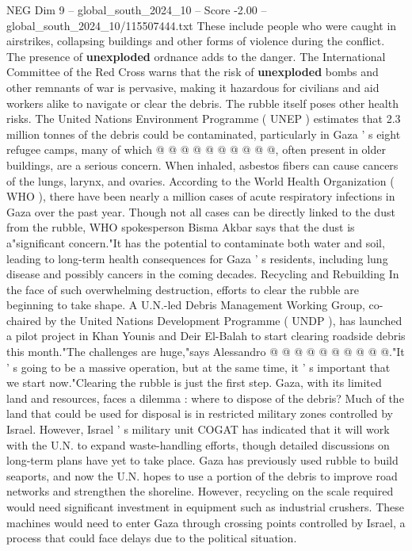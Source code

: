 \begin{textsample}{NEG Dim 9 – global\_south\_2024\_10 – Score -2.00 – global\_south\_2024\_10/115507444.txt}
These include people who were caught in airstrikes, collapsing buildings and other forms of violence during the conflict.
The presence of \textbf{unexploded} ordnance adds to the danger.
The International Committee of the Red Cross warns that the risk of \textbf{unexploded} bombs and other remnants of war is pervasive, making it hazardous for civilians and aid workers alike to navigate or clear the debris.
The rubble itself poses other health risks.
The United Nations Environment Programme ( UNEP ) estimates that 2.3 million tonnes of the debris could be contaminated, particularly in Gaza ' s eight refugee camps, many of which @ @ @ @ @ @ @ @ @ @, often present in older buildings, are a serious concern.
When inhaled, asbestos fibers can cause cancers of the lungs, larynx, and ovaries.
According to the World Health Organization ( WHO ), there have been nearly a million cases of acute respiratory infections in Gaza over the past year.
Though not all cases can be directly linked to the dust from the rubble, WHO spokesperson Bisma Akbar says that the dust is a"significant concern."It has the potential to contaminate both water and soil, leading to long-term health consequences for Gaza ' s residents, including lung disease and possibly cancers in the coming decades.
Recycling and Rebuilding In the face of such overwhelming destruction, efforts to clear the rubble are beginning to take shape.
A U.N.-led Debris Management Working Group, co-chaired by the United Nations Development Programme ( UNDP ), has launched a pilot project in Khan Younis and Deir El-Balah to start clearing roadside debris this month."The challenges are huge,"says Alessandro @ @ @ @ @ @ @ @ @ @."It ' s going to be a massive operation, but at the same time, it ' s important that we start now."Clearing the rubble is just the first step.
Gaza, with its limited land and resources, faces a dilemma : where to dispose of the debris?
Much of the land that could be used for disposal is in restricted military zones controlled by Israel.
However, Israel ' s military unit COGAT has indicated that it will work with the U.N. to expand waste-handling efforts, though detailed discussions on long-term plans have yet to take place.
Gaza has previously used rubble to build seaports, and now the U.N. hopes to use a portion of the debris to improve road networks and strengthen the shoreline.
However, recycling on the scale required would need significant investment in equipment such as industrial crushers.
These machines would need to enter Gaza through crossing points controlled by Israel, a process that could face delays due to the political situation.

\end{textsample}
